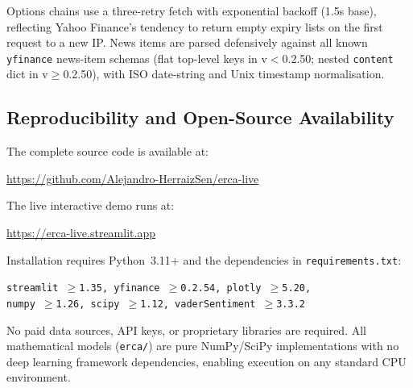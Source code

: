 \documentclass[10pt,twocolumn]{article}
\begin{document}
Options chains use a three-retry fetch with exponential backoff (1.5s base),
reflecting Yahoo Finance's tendency to return empty expiry lists on the first
request to a new IP. News items are parsed defensively against all known
\texttt{yfinance} news-item schemas (flat top-level keys in v$<$0.2.50;
nested \texttt{content} dict in v$\ge$0.2.50), with ISO date-string and
Unix timestamp normalisation.

\subsection{Reproducibility and Open-Source Availability}

The complete source code is available at:
\begin{center}
\url{https://github.com/Alejandro-HerraizSen/erca-live}
\end{center}

The live interactive demo runs at:
\begin{center}
\url{https://erca-live.streamlit.app}
\end{center}

Installation requires Python~3.11$+$ and the dependencies in
\texttt{requirements.txt}:
\begin{center}
\texttt{streamlit $\ge$1.35, yfinance $\ge$0.2.54, plotly $\ge$5.20,}\\
\texttt{numpy $\ge$1.26, scipy $\ge$1.12, vaderSentiment $\ge$3.3.2}
\end{center}

No paid data sources, API keys, or proprietary libraries are required.
All mathematical models (\texttt{erca/}) are pure NumPy/SciPy implementations
with no deep learning framework dependencies, enabling execution on any
standard CPU environment.

\begin{table}[htbp]
\centering
\caption{ERCA Open-Source Module Summary}
\label{tab:modules}
\end{table}
\end{document}
